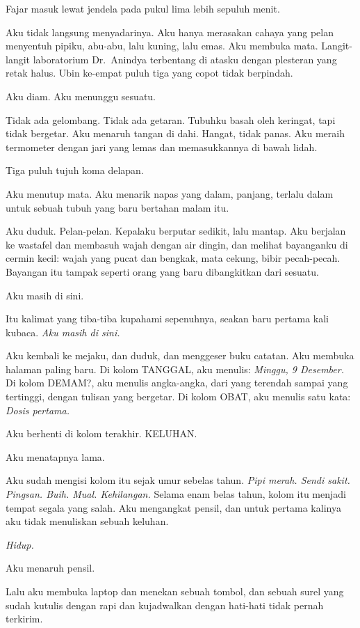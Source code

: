 \documentclass[11pt,twoside,openany]{book}
\makeatletter
\newcommand{\scenebreak}{\par\vspace{0.9em}{\centering\textsc{*\hspace{0.7em}*\hspace{0.7em}*}\par}\vspace{0.9em}\@afterindentfalse\@afterheading}
\makeatother
\begin{document}
\scenebreak
Fajar masuk lewat jendela pada pukul lima lebih sepuluh menit.

Aku tidak langsung menyadarinya. Aku hanya merasakan cahaya yang pelan menyentuh pipiku, abu-abu, lalu kuning, lalu emas. Aku membuka mata. Langit-langit laboratorium Dr.~Anindya terbentang di atasku dengan plesteran yang retak halus. Ubin ke-empat puluh tiga yang copot tidak berpindah.

Aku diam. Aku menunggu sesuatu.

Tidak ada gelombang. Tidak ada getaran. Tubuhku basah oleh keringat, tapi tidak bergetar. Aku menaruh tangan di dahi. Hangat, tidak panas. Aku meraih termometer dengan jari yang lemas dan memasukkannya di bawah lidah.

Tiga puluh tujuh koma delapan.

Aku menutup mata. Aku menarik napas yang dalam, panjang, terlalu dalam untuk sebuah tubuh yang baru bertahan malam itu.

Aku duduk. Pelan-pelan. Kepalaku berputar sedikit, lalu mantap. Aku berjalan ke wastafel dan membasuh wajah dengan air dingin, dan melihat bayanganku di cermin kecil: wajah yang pucat dan bengkak, mata cekung, bibir pecah-pecah. Bayangan itu tampak seperti orang yang baru dibangkitkan dari sesuatu.

Aku masih di sini.

Itu kalimat yang tiba-tiba kupahami sepenuhnya, seakan baru pertama kali kubaca. \emph{Aku masih di sini.}

Aku kembali ke mejaku, dan duduk, dan menggeser buku catatan. Aku membuka halaman paling baru. Di kolom TANGGAL, aku menulis: \emph{Minggu, 9 Desember.} Di kolom DEMAM?, aku menulis angka-angka, dari yang terendah sampai yang tertinggi, dengan tulisan yang bergetar. Di kolom OBAT, aku menulis satu kata: \emph{Dosis pertama.}

Aku berhenti di kolom terakhir. KELUHAN.

Aku menatapnya lama.

Aku sudah mengisi kolom itu sejak umur sebelas tahun. \emph{Pipi merah. Sendi sakit. Pingsan. Buih. Mual. Kehilangan.} Selama enam belas tahun, kolom itu menjadi tempat segala yang salah. Aku mengangkat pensil, dan untuk pertama kalinya aku tidak menuliskan sebuah keluhan.

\emph{Hidup.}

Aku menaruh pensil.

Lalu aku membuka laptop dan menekan sebuah tombol, dan sebuah surel yang sudah kutulis dengan rapi dan kujadwalkan dengan hati-hati tidak pernah terkirim.
\end{document}

